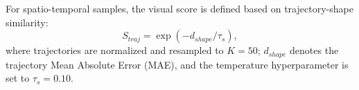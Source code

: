 \documentclass{llmxive}
\begin{document}
For spatio-temporal samples, the visual score is defined based on trajectory-shape similarity:
\begin{equation}
S_{traj}
=
\exp(-d_{shape}/\tau_s),
\end{equation}
where trajectories are normalized and resampled to \(K=50\); \(d_{shape}\) denotes the trajectory Mean Absolute Error (MAE), and the temperature hyperparameter is set to \(\tau_s = 0.10\).





\end{document}
